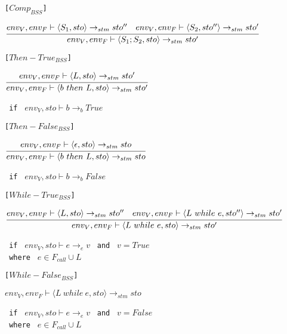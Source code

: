 \texttt{[$Comp_{BSS}$]}\\
\begin{center}
	\begin{math}
		\cfrac
			{env_V, env_F \vdash \langle S_1, sto \rangle \rightarrow_{stm} sto'' \quad env_V, env_F \vdash \langle S_2, sto'' \rangle \rightarrow_{stm} sto'}
			{env_V, env_F \vdash \langle S_1; S_2, sto \rangle \rightarrow_{stm} sto'}
	\end{math}
\end{center}

\texttt{[$Then-True_{BSS}$]}\\
\begin{center}
	\begin{math}
		\cfrac
			{env_V, env_F \vdash \langle L,sto \rangle \rightarrow_{stm} sto'}
			{env_V, env_F \vdash \langle b\ then\ L, sto \rangle \rightarrow_{stm} sto'}
	\end{math}
	
	\texttt{ if } $env_V, sto \vdash b \rightarrow_b True$
\end{center}

\texttt{[$Then-False_{BSS}$]}\\
\begin{center}
	\begin{math}
	\cfrac
	{env_V, env_F \vdash \langle \epsilon,sto \rangle \rightarrow_{stm} sto}
	{env_V, env_F \vdash \langle b\ then\ L, sto \rangle \rightarrow_{stm} sto}
	\end{math}
	
	\texttt{ if } $env_V, sto \vdash b \rightarrow_b False$
\end{center}

\texttt{[$While-True_{BSS}$]}\\
\begin{center}
	\begin{math}
		\cfrac
			{env_V, env_F \vdash \langle L, sto \rangle \rightarrow_{stm} sto'' \quad env_V, env_F \vdash \langle L\ while\ e, sto'' \rangle \rightarrow_{stm} sto'}
			{env_V, env_F \vdash \langle L\ while\ e, sto \rangle \rightarrow_{stm} sto'}
	\end{math}
	
	\texttt{ if } $env_V, sto \vdash e \rightarrow_e v$
	\texttt{ and } $v = True$\\
	\texttt{ where } $e \in F_{call} \cup L$
\end{center}

\texttt{[$While-False_{BSS}$]}\\
\begin{center}
	\begin{math}
	{env_V, env_F \vdash \langle L\ while\ e, sto \rangle \rightarrow_{stm} sto}
	\end{math}
	
	\texttt{ if } $env_V, sto \vdash e \rightarrow_e v$
	\texttt{ and } $v = False$\\
	\texttt{ where } $e \in F_{call} \cup L$
\end{center}

